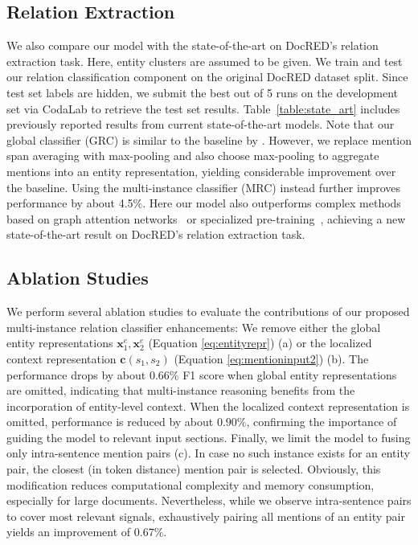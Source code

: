 \documentclass[11pt,a4paper]{article}
\begin{document}
\subsection{Relation Extraction}
We also compare our model with the state-of-the-art on DocRED's relation extraction task. Here, entity clusters are assumed to be given. We train and test our relation classification component on the original DocRED dataset split. Since test set labels are hidden, we submit the best out of 5 runs on the development set via CodaLab to retrieve the test set results. Table~\ref{table:state_art} includes previously reported results from current state-of-the-art models. Note that our global classifier (GRC) is similar to the baseline by \cite{yao:2019:docred}. However, we replace mention span averaging with max-pooling and also choose max-pooling to aggregate mentions into an entity representation, yielding considerable improvement over the baseline. Using the multi-instance classifier (MRC) instead further improves performance by about 4.5\%. Here our model also outperforms complex methods based on graph attention networks~\cite{nan:2020:bert_lsr} or specialized pre-training~\cite{ye:2020:coref_bert}, achieving a new state-of-the-art result on DocRED's relation extraction task.

\subsection{Ablation Studies}

We perform several ablation studies to evaluate the contributions of our proposed multi-instance relation classifier enhancements: We remove either the global entity representations $\mathbf{x}_1^e,\mathbf{x}_2^e$ (Equation \ref{eq:entityrepr}) (a) or the localized context representation $\mathbf{c}(s_1,s_2)$ (Equation \ref{eq:mentioninput2}) (b). The performance drops by about $0.66\%$ F1 score when global entity representations are omitted, indicating that multi-instance reasoning benefits from the incorporation of entity-level context. When the localized context representation is omitted, performance is reduced by about $0.90\%$, confirming the importance of guiding the model to relevant input sections. Finally, we limit the model to fusing only intra-sentence mention pairs (c). In case no such instance exists for an entity pair, the closest (in token distance) mention pair is selected. Obviously, this modification reduces computational complexity and memory consumption, especially for large documents. Nevertheless, while we observe intra-sentence pairs to cover most relevant signals, exhaustively pairing all mentions of an entity pair yields an improvement of $0.67\%$. 
\end{document}

